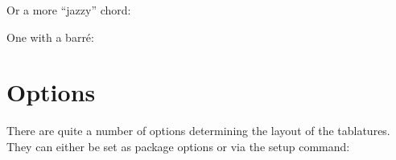 \documentclass[toc=index,toc=bib]{cnpkgdoc}
\begin{document}
Or a more “jazzy” chord:
\begin{beispiel}
 \chordscheme[
   name      = G\textsuperscript{6} ,
   position  = II ,
   finger    = {1/4/1, 3/3/4, 2/2/3} ,
   root      = 2/6/2 ,
   show-root = 4/4 ,
   mute      = {1,5}
 ]
\end{beispiel}

One with a barr\'e:

\begin{beispiel}
 \chordscheme[
   name      = Gmi\textsuperscript{7} ,
   position  = II ,
   barre     = 2/2-4/3 ,
   show-root = 4/4 ,
   root      = 2/6/2 ,
   mute      = {1,5}
 ]
\end{beispiel}

\section{Options}
There are quite a number of options determining the layout of the tablatures.
They can either be set as package options or via the setup command:
\begin{beschreibung}
\end{beschreibung}
\end{document}
